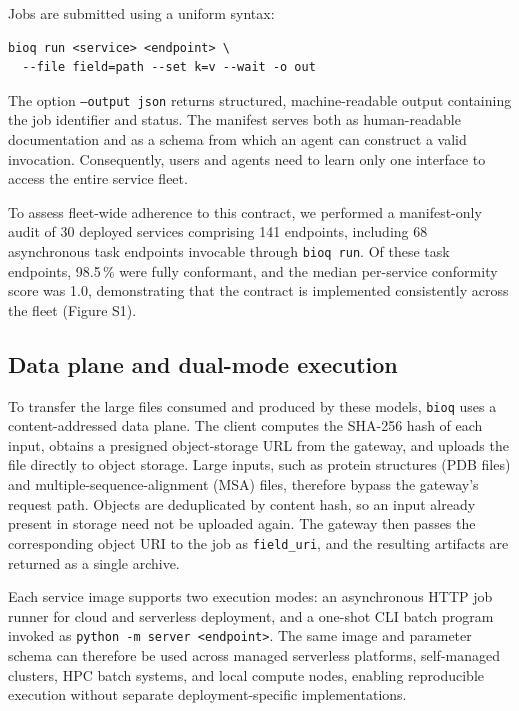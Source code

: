\documentclass[webpdf,contemporary,large,namedate]{oup-authoring-template}%
\begin{document}
Jobs are submitted using a uniform syntax:

\begin{verbatim}
bioq run <service> <endpoint> \
  --file field=path --set k=v --wait -o out
\end{verbatim}

The option \texttt{--output json} returns structured, machine-readable
output containing the job identifier and status. The manifest serves
both as human-readable documentation and as a schema from which an
agent can construct a valid invocation. Consequently, users and agents
need to learn only one interface to access the entire service fleet.

To assess fleet-wide adherence to this contract, we performed a
manifest-only audit of 30 deployed services comprising 141 endpoints,
including 68 asynchronous task endpoints invocable through
\texttt{bioq run}. Of these task endpoints, 98.5\,\% were fully
conformant, and the median per-service conformity score was 1.0,
demonstrating that the contract is implemented consistently across the
fleet (Figure S1).

\subsection{Data plane and dual-mode execution}\label{sec:dataplane}


To transfer the large files consumed and produced by these models,
\texttt{bioq} uses a content-addressed data plane. The client computes the
SHA-256 hash of each input, obtains a presigned object-storage URL
from the gateway, and uploads the file directly to object
storage. Large inputs, such as protein structures (PDB files) and
multiple-sequence-alignment (MSA) files, therefore bypass the
gateway's request path. Objects are deduplicated by content hash, so
an input already present in storage need not be uploaded again. The
gateway then passes the corresponding object URI to the job as
\texttt{field\_uri}, and the resulting artifacts are returned as a
single archive.

Each service image supports two execution modes: an asynchronous HTTP
job runner for cloud and serverless deployment, and a one-shot CLI
batch program invoked as \texttt{python -m server <endpoint>}. The same
image and parameter schema can therefore be used across managed
serverless platforms, self-managed clusters, HPC batch systems, and
local compute nodes, enabling reproducible execution without separate
deployment-specific implementations.
\end{document}
